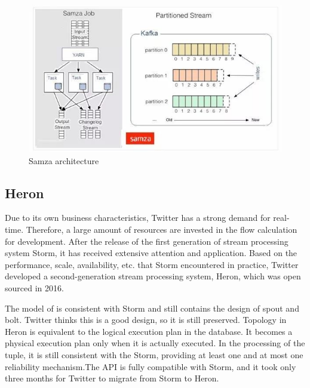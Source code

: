 \documentclass[journal]{IEEEtran}
\begin{document}
\begin{figure}
\includegraphics[width=\linewidth]{samza.jpeg}
\caption{Samza architecture}
\label{Samza}
\end{figure}


\subsection{Heron}
Due to its own business characteristics, Twitter has a strong demand for real-time. Therefore, a large amount of resources are invested in the flow calculation for development. After the release of the first generation of stream processing system Storm, it has received extensive attention and application. Based on the performance, scale, availability, etc. that Storm encountered in practice, Twitter developed a second-generation stream processing system, Heron, which was open sourced in 2016.

The model of is consistent with Storm and still contains the design of spout and bolt. Twitter thinks this is a good design, so it is still preserved. Topology in Heron is equivalent to the logical execution plan in the database. It becomes a physical execution plan only when it is actually executed.
In the processing of the tuple, it is still consistent with the Storm, providing at least one and at most one reliability mechanism.The API is fully compatible with Storm, and it took only three months for Twitter to migrate from Storm to Heron.
\end{document}
